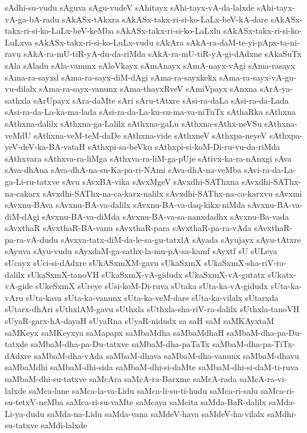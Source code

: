 {sAdhi-su-vudu
sAguva
sAgu-vudeV
sAhitayx
sAhi-tayx-vA-da-lalxde
sAhi-tayx-vA-ga-bA-radu
sAkASx-tAkxra
sAkASx-takx-ri-si-ko-LaLx-beV-kA-dare
sAkASx-takx-ri-si-ko-LaLx-beV-keMba
sAkASx-takx-ri-si-ko-LaLxlu
sAkASx-takx-ri-si-ko-LuLxva
sAkASx-takx-ri-si-ko-LuLx-vudu
sAkAra
sAkA-ra-daM-te-yi-pApx-ta-ni-ravu
sAkA-ra-mU-tiR-yA-du-da-riMda
sAkA-ra-mU-tiR-yA-gi-dAdxne
sAkaSuTx
sAla
sAladu
sAla-vanunx
sAloVkayx
sAmAnayx
sAmA-nayx-vAgi
sAma-rasayx
sAma-ra-sayxd
sAma-ra-sayx-diM-dAgi
sAma-ra-sayxkekx
sAma-ra-sayx-vA-gu-vu-dilalx
sAma-ra-sayx-vanunx
sAma-thayxRveV
sAmiVpayx
sAnxna
sArA-ya-sathxla
sArUpayx
sAra-daMte
sAri
sAru-tAtxre
sAsi-ra-daLa
sAsi-ra-da-Lada
sAsi-ra-da-La-ka-ma-lada
sAsi-ra-da-La-ku-su-ma-va-niTuTx
sAthaRka
sAthxna
sAthxna-dalilx
sAthxna-ga-Lalilx
sAthxna-gaLu
sAthxna-sAthx-neVSu
sAthxna-veMdU
sAthxna-veM-teM-daDe
sAthxna-vide
sAthxneV
sAthxpa-neyeV
sAthxpa-yeV-deV-ka-BA-vataH
sAthxpi-sa-beVku
sAthxpi-si-koM-Di-ru-vu-da-riMda
sAthxvara
sAthxva-ra-liMga
sAthxva-ra-liM-ga-pUje
sAtivx-ka-ra-nAnxgi
sAva
sAva-dhAna
sAva-dhA-na-su-Ka-pa-ri-NAmi
sAva-dhA-na-veMba
sAvi-ra-da-La-ga-Li-ru-tatxve
sAvu
sAvxBA-vika
sAvxMgeV
sAvxdhi-SAThxna
sAvxdhi-SAThx-na-cakarx
sAvxdhi-SAThx-na-ca-karx-nalilx
sAvxdhi-SAThx-na-ca-karxvu
sAvxmi
sAvxnu-BAva
sAvxnu-BA-va-dalilx
sAvxnu-BA-va-daq-kikx-niMda
sAvxnu-BA-va-diM-dAgi
sAvxnu-BA-va-diMda
sAvxnu-BA-va-sa-nanxdadhx
sAvxnu-Ba-vada
sAvxthaR
sAvxthaR-BA-vanu
sAvxthaR-para
sAvxthaR-pa-ra-vAda
sAvxthaR-pa-ra-vA-dudu
sAvxya-tatx-diM-da-le-sa-gu-tatxlA
sAyada
sAyujayx
sAyu-tAtxre
sAyuva
sAyu-vudu
sAyxdaM-ga-sathx-la-mu-pA-sa-kamf
sAyxtf
sU
sULeya
sUcayx
sUci-si-dAdxre
sUkASxmXM-gavu
sUkaSxmX
sUkaSxmX-sha-riV-ra-dalilx
sUkaSxmX-tanoVH
sUkaSxmX-vA-gidudx
sUkaSxmX-vA-gutatx
sUkatx-vA-gide
sUkeSxmX
sUreye
sUsi-koM-Di-ruva
sUtaka
sUta-ka-vA-gidudx
sUta-ka-vAru
sUta-kava
sUta-ka-vanunx
sUta-ka-veM-dare
sUta-ka-vilalx
sUtarxda
sUtarx-dhAri
sUthxlAM-gavu
sUthxla
sUthxla-sha-riV-ra-dalilx
sUthxla-tanoVH
sUyaR-garx-hA-dayaH
sUyaRna
sUyaR-nidudx
sa
saH
saM
saMKAyxtaM
saMKeyx
saMKeyxya
saMapapx
saMbaMdha
saMbaMdhaH
saMbaM-dha-pa-Du-tatxde
saMbaM-dha-pa-Du-tatxve
saMbaM-dha-paTaTx
saMbaM-dha-pa-TiTx-dAdxre
saMbaM-dha-vAda
saMbaM-dhava
saMbaM-dha-vanunx
saMbaM-dhavu
saMbaMdhi
saMbaM-dhi-sida
saMbaM-dhi-si-daMte
saMbaM-dhi-si-daM-ti-ruva
saMbaM-dhi-su-tatxve
saMcAra
saMcA-ra-Barxme
saMcA-rada
saMcA-ra-vi-lalxde
saMca-lane
saMca-la-va-Lidu
saMca-li-su-ti-hudu
saMca-ri-salu
saMca-ri-su-tetxV-neMba
saMca-ri-su-vaMte
saMcaya
saMcita
saMda-BaR-dalilx
saMda-Li-ya-dudu
saMda-na-Lidu
saMda-vana
saMdeV-hava
saMdeV-ha-vilalx
saMdhi-su-tatxve
saMdi-lalxde
}
